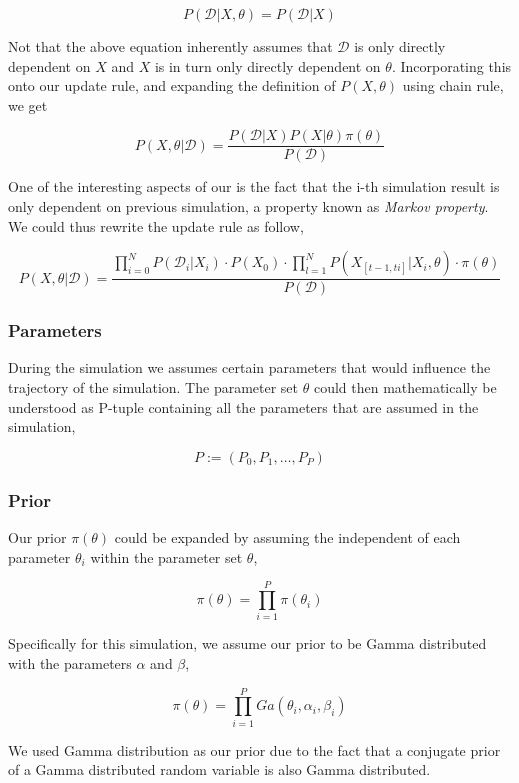 \documentclass[12pt, oneside]{article}
\begin{document}
$$P(\mathcal{D} | X, \theta) = P(\mathcal{D} | X)$$

Not that the above equation inherently assumes that $\mathcal{D}$ is only directly dependent on $X$ and $X$ is in turn only directly dependent on $\theta$. Incorporating this onto our update rule, and expanding the definition of $P(X, \theta)$ using chain rule, we get

$$
P(X, \theta | \mathcal{D}) = \frac{P(\mathcal{D} | X)  P(X | \theta) \pi(\theta)}{P(\mathcal{D})}
$$

One of the interesting aspects of our is the fact that the i-th simulation result is only dependent on previous simulation, a property known as \textit{Markov property}. We could thus rewrite the update rule as follow,


$$
P(X, \theta | \mathcal{D}) = \frac{\prod_{i=0}^{N} P(\mathcal{D}_i | X_i) \cdot P(X_0) \cdot \prod_{l=1}^{N} P(X_{[t-1, ti]} | X_i, \theta) \cdot \pi(\theta)}{P(\mathcal{D})}
$$

\subsubsection{Parameters}

During the simulation we assumes certain parameters that would influence the trajectory of the simulation. The parameter set $\theta$ could then mathematically be understood as P-tuple containing all the parameters that are assumed in the simulation,

$$P := (P_0, P_1, \dots , P_P)$$


\subsubsection{Prior}

Our prior $\pi(\theta)$ could be expanded by assuming the independent of each parameter $\theta_i$ within the parameter set $\theta$,

$$\pi(\theta) = \prod_{i=1}^{P} \pi(\theta_i)$$

Specifically for this simulation, we assume our prior to be Gamma distributed with the parameters $\alpha$ and $\beta$,

$$\pi(\theta) = \prod_{i=1}^{P} Ga(\theta_i, \alpha_i, \beta_i)$$

We used Gamma distribution as our prior due to the fact that a conjugate prior of a Gamma distributed random variable is also Gamma distributed.
\end{document}
